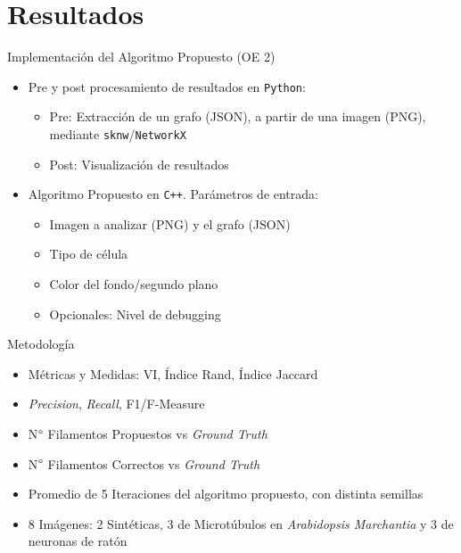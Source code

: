 \section{Resultados}

\begin{frame}{Implementaci\'on del Algoritmo Propuesto (OE 2)}
    \begin{itemize}
        \item Pre y post procesamiento de resultados en {\tt Python}: 
        \begin{itemize}
            \item Pre: Extracci\'on de un grafo (JSON), a partir de una imagen (PNG),  mediante {\tt sknw}/{\tt NetworkX}
            \item Post: Visualizaci\'on de resultados
        \end{itemize}
        
        \item Algoritmo Propuesto en {\tt C++}. Par\'ametros de entrada:
        \begin{itemize}
            \item Imagen a analizar (PNG) y el grafo (JSON)
            \item Tipo de c\'elula
            \item Color del fondo/segundo plano
            \item Opcionales: Nivel de debugging
        \end{itemize}
        
        
    \end{itemize}
\end{frame}

\begin{frame}{Metodolog\'ia}
\begin{itemize}
    \item M\'etricas y Medidas: VI, \'Indice Rand, \'Indice Jaccard
    \item {\it Precision}, {\it Recall}, F1/F-Measure
    \item N$\degree$ Filamentos Propuestos vs {\it Ground Truth}
    \item N$\degree$ Filamentos Correctos vs {\it Ground Truth}
    \item Promedio de 5 Iteraciones del algoritmo propuesto, con distinta semillas
    \item 8 Im\'agenes: 2 Sint\'eticas, 3 de Microt\'ubulos en {\it Arabidopsis Marchantia} y 3 de neuronas de rat\'on
\end{itemize}
\end{frame}

